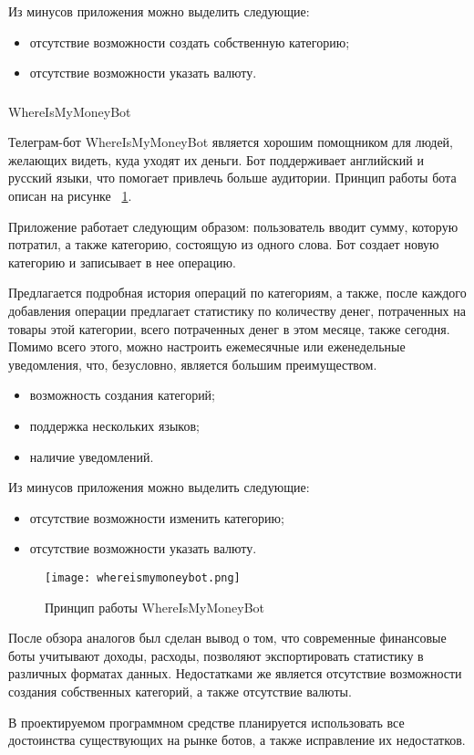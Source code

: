 Из минусов приложения можно выделить следующие:

\begin{itemize}
	\item отсутствие возможности создать собственную категорию;
	\item отсутствие возможности указать валюту.
\end{itemize}

\subsubsection{} WhereIsMyMoneyBot
\label{sec:analysis:analogues:whereismymoney}

Телеграм-бот WhereIsMyMoneyBot является хорошим помощником для людей, желающих видеть, куда уходят их деньги. Бот поддерживает английский и русский языки, что помогает привлечь больше аудитории. Принцип работы бота описан на рисунке ~\ref{fig:analysis:analogues:whereismymoneybot}.

Приложение работает следующим образом: пользователь вводит сумму, которую потратил, а также категорию, состоящую из одного слова. Бот создает новую категорию и записывает в нее операцию.

Предлагается подробная история операций по категориям, а также, после каждого добавления операции предлагает статистику по количеству денег, потраченных на товары этой категории, всего потраченных денег в этом месяце, также сегодня. Помимо всего этого, можно настроить ежемесячные или еженедельные уведомления, что, безусловно, является большим преимуществом.

\begin{itemize}
	\item возможность создания категорий;
	\item поддержка нескольких языков;
	\item наличие уведомлений.
\end{itemize}

Из минусов приложения можно выделить следующие:

\begin{itemize}
	\item отсутствие возможности изменить категорию;
	\item отсутствие возможности указать валюту.
\end{itemize}

\begin{figure}
	\centering
	\texttt{[image: whereismymoneybot.png]} 
	\caption{Принцип работы WhereIsMyMoneyBot}
	\label{fig:analysis:analogues:whereismymoneybot}
\end{figure}

После обзора аналогов был сделан вывод о том, что современные финансовые боты учитывают доходы, расходы, позволяют экспортировать статистику в различных форматах данных. Недостатками же является отсутствие возможности создания собственных категорий, а также отсутствие валюты.

В проектируемом программном средстве планируется использовать все достоинства существующих на рынке ботов, а также исправление их недостатков.


